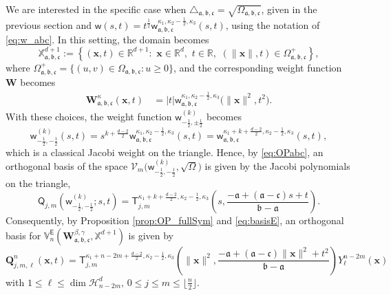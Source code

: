 \documentclass{amsart}
\theoremstyle{remark}
\def\sw{{\mathsf w}}
\def\sE{{\mathsf E}}
\def\sQ{{\mathsf Q}}
\def\sT{{\mathsf T}}
\def\sW{{\mathsf W}}
\def\fa{{\mathfrak a}}
\def\fb{{\mathfrak b}}
\def\fc{{\mathfrak c}}
\def\b{{\beta}}
\def\g{{\gamma}}
\def\k{{\kappa}}
\def\xb{{\mathbf x}}
\def\Qb{{\mathbf Q}}
\def\Wb{{\mathbf W}}
\def\CH{{\mathcal H}}
\def\CV{{\mathcal V}}
\def\RR{{\mathbb R}}
\def\VV{{\mathbb V}}
\def\XX{{\mathbb X}}
\def\f{\frac}
\begin{document}
We are interested in the specific case when $ \triangle_{\fa,\fb,\fc}= \sqrt{\Omega_{\fa,\fb,\fc}}$, given in 
the previous section and $\sw(s,t) = t^{\f12} \sw_{\fa,\fb,\fc}^{\k_1,\k_2-\f12, \k_3}(s,t)$, using the notation of \eqref{eq:w_abc}. In this
setting, the domain becomes 
$$
\XX_{\fa,\fb,\fc}^{d+1} := \left \{ (\xb,t) \in  \RR^{d+1}: \,\,  \xb \in \RR^d, \,\,  t \in\RR,\,\,  
     (\|\xb \|,t ) \in \Omega_{\fa,\fb,\fc}^+ \right\},
$$
where $ \Omega_{\fa,\fb,\fc}^+ = \{(u,v) \in  \Omega_{\fa,\fb,\fc}: u \ge 0\}$, and the corresponding 
weight function $\Wb$ becomes 
\begin{align*}
  \Wb_{\fa,\fb,\fc}^\k (\xb,t) \,& = |t| \sw_{\fa,\fb,\fc}^{\k_1,\k_2-\f12, \k_3} \big(\|\xb\|^2, t^2 \big). %
\end{align*}
With these choices, the weight function $\sw_{-\f12,\pm \f12}^{(k)}$ becomes 
$$
    \sw_{-\f12, -\f12}^{(k)}(s,t) = s^{k+\frac{d-2}{2}} \sw_{\fa,\fb,\fc}^{\k_1,\k_2-\f12, \k_3}(s,t) 
      =  \sw_{\fa,\fb,\fc}^{\k_1+k+\frac{d-2}{2},\k_2-\f12, \k_3}(s,t), 
$$
which is a classical Jacobi weight on the triangle. Hence, by \eqref{eq:OPabc}, an orthogonal
basis of the space $\CV_m\big(\sw^{(k)}_{- \f12, -\f12}, \sqrt{\Omega}\big)$ is given by the Jacobi 
polynomials on the triangle,
$$
  \sQ_{j,m}\left(\sw^{(k)}_{-\f12, - \f12}; s,t \right) = \sT_{j,m}^{\k_1+k+\frac{d-2}{2},\k_2-\f12, \k_3}
       \left(s, \frac{-\fa+(\fa-\fc)s +t}{\fb-\fa} \right). 
$$
Consequently, by Proposition \ref{prop:OP_fullSym} and \eqref{eq:basisE}, an orthogonal basis for
$\VV_n^\sE(\Wb_{\fa,\fb,\fc}^{\b,\g}, \XX^{d+1})$ is given by 
\begin{equation}\label{eq:OP-k-abc}
  \Qb_{j,m,\ell}^n  (\xb,t) = 
 \sT_{j,m}^{\k_1+n-2m +\frac{d-2}{2},\k_2 -\f12, \k_3} \left(\|\xb\|^2, \frac{-\fa+(\fa-\fc)\|\xb\|^2 +t^2}{\fb-\fa} \right) Y_\ell^{n-2m} (\xb)
\end{equation}
with $1 \le \ell \le \dim \CH_{n-2m}^d, \,0\le j \le  m \le \lfloor \frac{n}{2} \rfloor$.  
\end{document}
